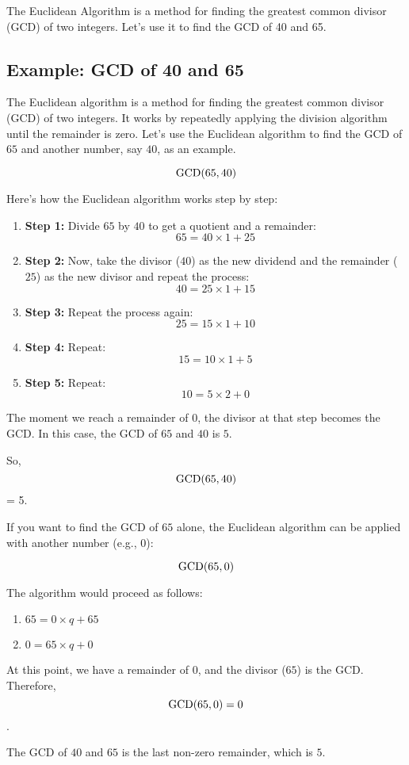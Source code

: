 \documentclass{article}
\begin{document}
The Euclidean Algorithm is a method for finding the greatest common divisor (GCD) of two integers. Let's use it to find the GCD of 40 and 65.

\subsection{Example: GCD of 40 and 65}

The Euclidean algorithm is a method for finding the greatest common divisor (GCD) of two integers. It works by repeatedly applying the division algorithm until the remainder is zero. Let's use the Euclidean algorithm to find the GCD of \(65\) and another number, say \(40\), as an example.

\[ \textnormal{GCD}(65, 40) \]

Here's how the Euclidean algorithm works step by step:

\begin{enumerate}
    \item \textbf{Step 1:} Divide \(65\) by \(40\) to get a quotient and a remainder:
    \[ 65 = 40 \times 1 + 25 \]
    
    \item \textbf{Step 2:} Now, take the divisor (\(40\)) as the new dividend and the remainder (\(25\)) as the new divisor and repeat the process:
    \[ 40 = 25 \times 1 + 15 \]
    
    \item \textbf{Step 3:} Repeat the process again:
    \[ 25 = 15 \times 1 + 10 \]
    
    \item \textbf{Step 4:} Repeat:
    \[ 15 = 10 \times 1 + 5 \]
    
    \item \textbf{Step 5:} Repeat:
    \[ 10 = 5 \times 2 + 0 \]
\end{enumerate}

The moment we reach a remainder of \(0\), the divisor at that step becomes the GCD. In this case, the GCD of \(65\) and \(40\) is \(5\).

So, \[ \textnormal{GCD}(65, 40) \]= 5.

If you want to find the GCD of \(65\) alone, the Euclidean algorithm can be applied with another number (e.g., \(0\)):

\[ \textnormal{GCD}(65, 0) \]


The algorithm would proceed as follows:

\begin{enumerate}
    \item \(65 = 0 \times q + 65\)
    \item \(0 = 65 \times q + 0\)
\end{enumerate}

At this point, we have a remainder of \(0\), and the divisor (\(65\)) is the GCD. Therefore, \[ \textnormal{GCD}(65, 0) = 0\]
.

The GCD of $40$ and $65$ is the last non-zero remainder, which is $5$.
\end{document}
